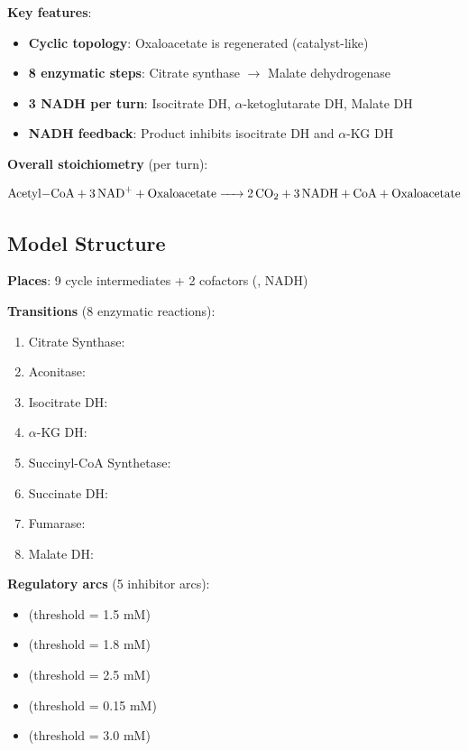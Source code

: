 \textbf{Key features}:

\begin{itemize}
    \item \textbf{Cyclic topology}: Oxaloacetate is regenerated (catalyst-like)
    \item \textbf{8 enzymatic steps}: Citrate synthase $\to$ Malate dehydrogenase
    \item \textbf{3 NADH per turn}: Isocitrate DH, $\alpha$-ketoglutarate DH, Malate DH
    \item \textbf{NADH feedback}: Product inhibits isocitrate DH and $\alpha$-KG DH
\end{itemize}

\textbf{Overall stoichiometry} (per turn):

\begin{equation}
\ce{Acetyl-CoA + 3 NAD+ + Oxaloacetate -> 2 CO2 + 3 NADH + CoA + Oxaloacetate}
\end{equation}

\subsection{Model Structure}
\label{subsec:tca-model}

\textbf{Places}: 9 cycle intermediates + 2 cofactors (, NADH)

\textbf{Transitions} (8 enzymatic reactions):

\begin{enumerate}
    \item Citrate Synthase: 
    \item Aconitase: 
    \item Isocitrate DH: 
    \item $\alpha$-KG DH: 
    \item Succinyl-CoA Synthetase: 
    \item Succinate DH: 
    \item Fumarase: 
    \item Malate DH: 
\end{enumerate}

\textbf{Regulatory arcs} (5 inhibitor arcs):

\begin{itemize}
    \item {} (threshold = 1.5 mM)
    \item {} (threshold = 1.8 mM)
    \item {} (threshold = 2.5 mM)
    \item {} (threshold = 0.15 mM)
    \item {} (threshold = 3.0 mM)
\end{itemize}

